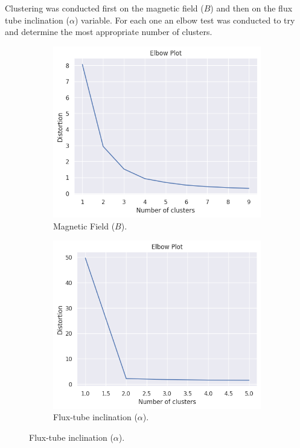 Clustering was conducted first on the magnetic field ($B$) and then on the flux tube inclination ($\alpha$) variable. For each one an elbow test was conducted to try and determine the most appropriate number of clusters. 

\begin{figure}[h]
    \caption{TimeSeriesKMeans Elbow Tests}
    \begin{subfigure}[h]{0.48\textwidth}
        \centering
        \includegraphics[width=\textwidth]{figures/tskmeans_elbow_b.png}
        \caption{Magnetic Field ($B$).}
        \label{fig:elbow_b}
    \end{subfigure}
    \hfill
    \begin{subfigure}[h]{0.48\textwidth}
        \centering
        \includegraphics[width=\textwidth]{figures/tskmeans_elbow_alpha.png}
        \caption{Flux-tube inclination ($\alpha$).}
        \label{fig:elbow_alpha}
    \end{subfigure}
\end{figure}

